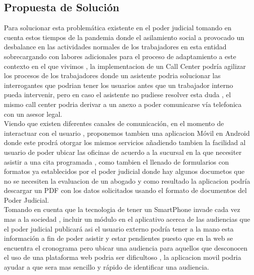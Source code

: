 \documentclass[twoside,twocolumn]{article}
\begin{document}
\subsection{Propuesta de Solución}
Para solucionar esta problemática existente en el poder judicial tomando en cuenta estos tiempos de la pandemia donde el asilamiento social a provocado un desbalance en las actividades normales de los trabajadores en esta entidad sobrecargando con labores adicionales para el proceso de adaptamiento a este contexto en el que vivimos , la implementacion de un Call Center podría agilizar los procesos de los trabajadores donde un asistente podria solucionar las interrogantes que podrian tener los usuarios antes que un trabajador interno pueda intervenir, pero en caso el asistente no pudiese resolver esta duda , el mismo call center podria derivar a un anexo a poder comunicarse vía telefonica con un asesor legal.
\\
Viendo que existen diferentes canales de comunicación,  en el momento de interactuar con el usuario , proponemos tambien una aplicacion Móvil en Android donde este prodrá otorgar los mismos servicios añadiendo tambien la facilidad al usuario de poder ubicar las oficinas de acuerdo a la sucursal en la que necesiter asistir a una cita programada , como tambien  el llenado de formularios con formatos ya establecidos por el poder judicial donde hay algunos documetos que no se necesiten la evaluacion de un abogado y como resultado la aplicacion podría descargar un PDF con los datos solicitados usando el formato de documentos del Poder Judicial.
\\
Tomando en cuenta que la tecnologia de tener un SmartPhone invade cada vez mas a la sociedad , incluir un módulo en el aplicativo acerca de las audiencias que el poder judicial publicará asi el usuario externo podría tener a la mano esta información a fin de poder asistir y estar pendientes puesto que en la web se encuentra el cronograma pero ubicar una audiencia para aquellos que desconocen el uso de una plataforma web podria ser dificultoso , la aplicacion movil podria ayudar a que sera mas sencillo y rápido de identificar una audiencia.
\end{document}
